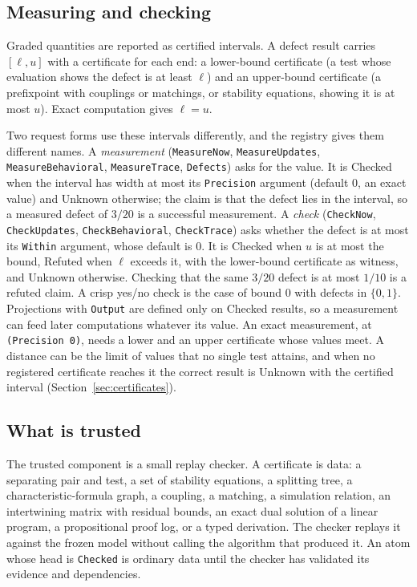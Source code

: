 \documentclass[11pt]{article}
\newcommand{\code}[1]{\texttt{#1}}
\theoremstyle{definition}
\theoremstyle{plain}
\begin{document}
\subsection{Measuring and checking}\label{sec:measurecheck}

Graded quantities are reported as certified intervals. A defect result carries $[\ell,u]$ with a
certificate for each end: a lower-bound certificate (a test whose evaluation shows the defect is
at least $\ell$) and an upper-bound certificate (a prefixpoint with couplings or matchings, or
stability equations, showing it is at most $u$). Exact computation gives $\ell=u$.

Two request forms use these intervals differently, and the registry gives them different names.
A \emph{measurement} (\code{MeasureNow}, \code{MeasureUpdates}, \code{MeasureBehavioral},
\code{MeasureTrace}, \code{Defects}) asks for the value. It is Checked when the interval has width
at most its \code{Precision} argument (default $0$, an exact value) and Unknown otherwise; the claim
is that the defect lies in the interval, so a measured defect of $3/20$ is a successful
measurement. A \emph{check} (\code{CheckNow}, \code{CheckUpdates}, \code{CheckBehavioral},
\code{CheckTrace}) asks whether the defect is at most its \code{Within} argument, whose default is
$0$. It is Checked when $u$ is at most the bound, Refuted when $\ell$ exceeds it, with the
lower-bound certificate as witness, and Unknown otherwise. Checking that the same $3/20$ defect is
at most $1/10$ is a refuted claim. A crisp yes/no check is the case of bound $0$ with defects in
$\{0,1\}$. Projections with \code{Output} are defined only on Checked results, so a measurement can
feed later computations whatever its value. An exact measurement, at \code{(Precision 0)}, needs a
lower and an upper certificate whose values meet. A distance can be the limit of values that no
single test attains, and when no registered certificate reaches it the correct result is Unknown
with the certified interval (Section~\ref{sec:certificates}).

\subsection{What is trusted}\label{sec:trustbase}

The trusted component is a small replay checker. A certificate is data: a separating pair and
test, a set of stability equations, a splitting tree, a characteristic-formula graph, a coupling,
a matching, a simulation relation, an intertwining matrix with residual bounds, an exact dual
solution of a linear program, a propositional proof log, or a typed derivation. The checker
replays it against the frozen model without calling the algorithm that produced it. An atom whose
head is \code{Checked} is ordinary data until the checker has validated its evidence and
dependencies.
\end{document}

